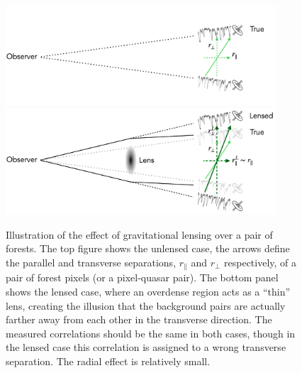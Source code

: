 \begin{figure}[!th]
    \centering
    \includegraphics[width=0.9\textwidth]{fig/forests/unlensed_forests.png}
    \includegraphics[width=0.9\textwidth]{fig/forests/lensed_forests.png}
    \caption{Illustration of the effect of gravitational lensing over a pair
    of \lya forests. The top figure shows the unlensed case, the arrows 
    define the parallel and transverse separations, $r_\parallel$ and $r_\perp$
    respectively, of a pair of \lya forest pixels (or a pixel-quasar pair). 
    The bottom panel shows the lensed case, where an overdense region acts 
    as a ``thin'' lens, creating the illusion that the background pairs are actually 
    farther away from each other in the transverse direction. 
    The measured correlations should be the same in both cases, though in the lensed 
    case this correlation is assigned to a wrong transverse separation. 
    The radial effect is relatively small.  
    }
    \label{fig:weak_lensing_forests}
\end{figure}

